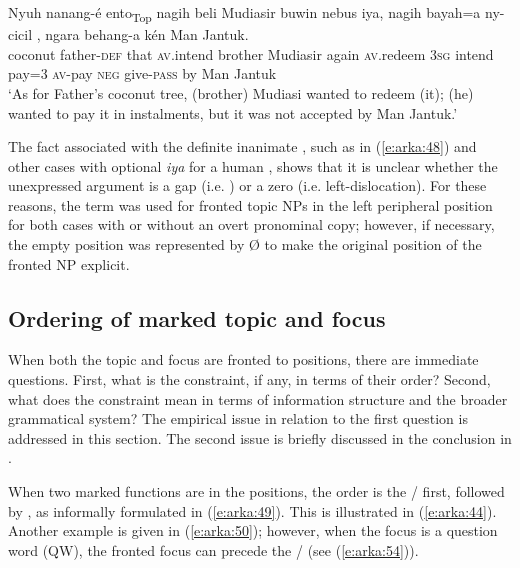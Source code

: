 \documentclass[output=paper
,modfonts
,nonflat]{langsci/langscibook}
\begin{document}
\begin{exe}
	\ex\label{e:arka:48}
	\gll {\ob}Nyuh  nanang-é  ento{\cb}\textsubscript{Top}  nagih  beli Mudiasir  buwin   nebus   {\USEmptySet}  {\USSlash}   {\USOParen}{\USStar}iya{\USCParen}, nagih   bayah=a  ny-{\USOParen}c{\USCParen}icil {\USEmptySet}, ngara  behang-a   kén   Man Jantuk.\\
	\phantom{[}coconut father-\textsc{def}  that   \textsc{av}.intend  brother Mudiasir again  \textsc{av}.redeem {} {} \phantom{(*}3\textsc{sg} intend  pay=3  \textsc{av}-pay {} \textsc{neg}  give-\textsc{pass}   by  Man Jantuk\\
	\glt ‘As for Father’s coconut tree, (brother) Mudiasi wanted to redeem (it); (he) wanted to pay it in instalments, but it was not accepted by Man Jantuk.’
\end{exe}

\noindent
The fact associated with the definite inanimate , such as in (\ref{e:arka:48}) and other cases with optional \textit{iya} for a human , shows that it is unclear whether the unexpressed argument is a gap (i.e. ) or a zero  (i.e. left-dislocation). For these reasons, the term  was used for fronted topic NPs in the left peripheral position for both cases with or without an overt pronominal copy; however, if necessary, the empty position was represented by Ø to make the original position of the fronted NP explicit.

\subsection{\label{s6.2}Ordering of marked topic and focus}

When both the topic and focus are fronted to  positions, there are immediate questions. First, what is the constraint, if any, in terms of their order? Second, what does the constraint mean in terms of information structure and the broader grammatical system? The empirical issue in relation to the first question is addressed in this section. The second issue is briefly discussed in the conclusion in . 

When two marked  functions are in the  positions, the order is the / first, followed by , as informally formulated in (\ref{e:arka:49}). This is illustrated in (\ref{e:arka:44}). Another example is given in (\ref{e:arka:50}); however, when the focus is a question word (QW), the fronted focus can precede the / (see (\ref{e:arka:54})).
\end{document}
